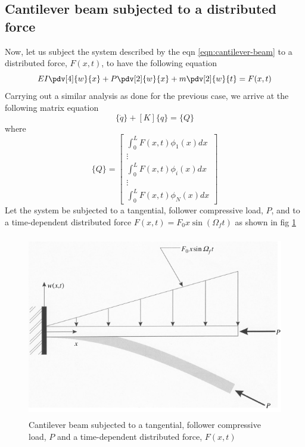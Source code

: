 \subsection{Cantilever beam subjected to a distributed force} Now, let us subject the system described by the eqn \ref{eqn:cantilever-beam} to a distributed force, $F(x,t)$, to have the following equation 
\begin{equation}
EI\pdv[4]{w}{x} + P\pdv[2]{w}{x} + m\pdv[2]{w}{t} = F(x,t) \label{eqn:cantilever-beam-forced}
\end{equation}
Carrying out a similar analysis as done for the previous case, we arrive at the following matrix equation
\begin{equation}
[M]\{\ddot{q}\} + [K]\{q\} = \{Q\} \label{eqn:matrix-equation-forced}
\end{equation}
where 
\[\{Q\} = \begin{bmatrix}
\int_0^L F(x,t)\phi_1(x)dx \\
\vdots  \\
\int_0^L F(x,t)\phi_i(x)dx \\
\vdots \\
\int_0^L F(x,t)\phi_N(x)dx
\end{bmatrix} 
\]                      
Let the system be subjected to a tangential, follower compressive load, $P$, and to a time-dependent distributed force $F(x,t) = F_0 x \sin(\Omega_f t)$ as shown in fig \ref{fig:forcing}

\begin{figure}[h!]
	\centering
	\includegraphics[height=8cm]{fig_2_2}
	\caption{Cantilever beam subjected to a tangential, follower compressive load, $P$ and a time-dependent distributed force, $F(x,t)$}
	\label{fig:forcing}
\end{figure}                   


